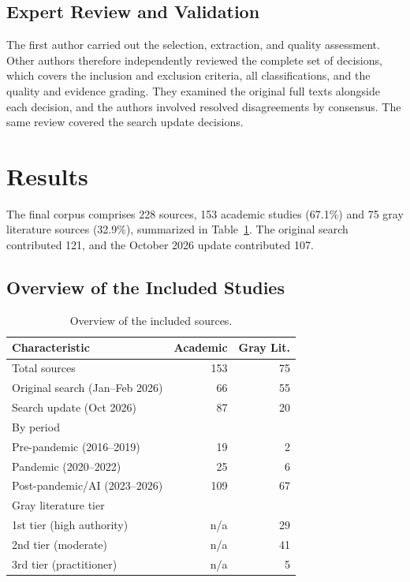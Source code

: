 \documentclass[preprint,number]{elsarticle}
\begin{document}
\subsection{Expert Review and Validation}
\label{sec:second-reviewer}
The first author carried out the selection, extraction, and quality assessment. Other authors therefore independently reviewed the complete set of decisions, which covers the inclusion and exclusion criteria, all classifications, and the quality and evidence grading. They examined the original full texts alongside each decision, and the authors involved resolved disagreements by consensus. The same review covered the search update decisions.


\section{Results}
\label{sec:results}

The final corpus comprises 228 sources, 153 academic studies (67.1\%) and 75 gray literature sources (32.9\%), summarized in Table~\ref{tab:overview}. The original search contributed 121, and the October 2026 update contributed 107.

\subsection{Overview of the Included Studies}
\label{sec:overview}

\begin{table}[htbp]
\centering
\caption{Overview of the included sources.}
\label{tab:overview}
\footnotesize
\begin{tabular}{l r r}
\toprule
\textbf{Characteristic} & \textbf{Academic} & \textbf{Gray Lit.} \\
\midrule
\rowcolor{lightgray}
Total sources & 153 & 75 \\
\quad Original search (Jan--Feb 2026) & 66 & 55 \\
\quad Search update (Oct 2026) & 87 & 20 \\
By period & & \\
\quad Pre-pandemic (2016--2019) & 19 & 2 \\
\quad Pandemic (2020--2022) & 25 & 6 \\
\quad Post-pandemic/AI (2023--2026) & 109 & 67 \\
\rowcolor{lightgray}
Gray literature tier & & \\
\quad 1st tier (high authority) & n/a & 29 \\
\quad 2nd tier (moderate) & n/a & 41 \\
\quad 3rd tier (practitioner) & n/a & 5 \\
\bottomrule
\end{tabular}
\end{table}
\end{document}
